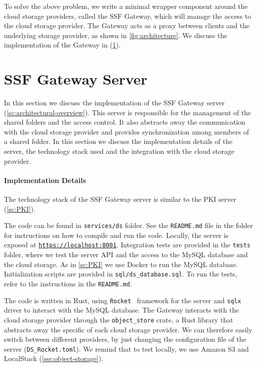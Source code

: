 To solve the above problem, we write a minimal wrapper component around
the cloud storage providers, called the SSF Gateway, which will manage
the access to the cloud storage provider. The Gateway acts as a proxy
between clients and the underlying storage provider, as shown in
\cref{fig:architecture}. We discuss the implementation of the
Gateway in (\cref{sc:ssf-proxy-server}).


\section{SSF Gateway Server}\label{sc:ssf-proxy-server}

In this section we discuss the implementation of the SSF Gateway server 
(\cref{sc:architectural-overview}). This server is responsible for the
management of the shared folders and the access control.
It also abstracts away the communication with the cloud storage provider
and provides synchronization among members of a shared folder.
In this section we discuss the implementation details
of the server, the technology stack used and the
integration with the cloud storage provider.

\paragraph{Implementation Details}
The technology stack of the SSF Gateway server
is similar to the PKI server (\cref{sc:PKI}).

The code can be found in \texttt{services/ds} folder.
See the \texttt{README.md} file in the folder for instructions
on how to compile and run the code.
Locally, the server is exposed at \texttt{\url{https://localhost:8001}}.
Integration tests are provided in the \texttt{tests} folder,
where we test the server API and the access to the 
MySQL database and the cloud storage.
As in \cref{sc:PKI} we use Docker to run the MySQL database.
Initialization scripts are provided in \texttt{sql/ds\_database.sql}.
To run the tests, refer to the instructions in the \texttt{README.md}.

The code is written in Rust, using \texttt{Rocket}~\cite{Rocket}
framework for the server and \texttt{sqlx} driver to interact
with the MySQL database.
The Gateway interacts with the cloud storage provider
through the \texttt{object\_store} crate, a Rust library
that abstracts away the specific of each cloud storage provider.
We can therefore easily switch between different providers, by
just changing the configuration file of the server (\texttt{DS\_Rocket.toml}).
We remind that to test locally, we use Amazon S3 and
LocalStack (\cref{ssc:object-storage}).

